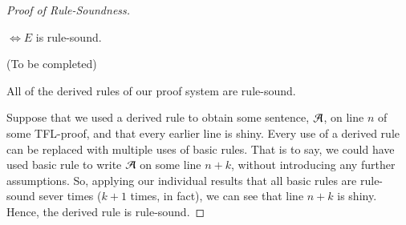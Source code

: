 \documentclass[12pt, a4paper, oneside, openright, titlepage]{book}
\begin{document}
\begin{proof}[Proof of Rule-Soundness]
    \begin{claim}[13]
        $\iff E$ is rule-sound.
    \end{claim}
    (To be completed)


    \begin{claim}[14]
        All of the derived rules of our proof system are rule-sound.
    \end{claim}
    Suppose that we used a derived rule to obtain some sentence, $\mathcal{A}$, on line $n$ of some TFL-proof, and that every earlier line is shiny. Every use of a derived rule can be replaced with multiple uses of basic rules. That is to say, we could have used basic rule to write $\mathcal{A}$ on some line $n+k$, without introducing any further assumptions. So, applying our individual results that all basic rules are rule-sound sever times ($k+1$ times, in fact), we can see that line $n+k$ is shiny. Hence, the derived rule is rule-sound.
\end{proof}







\begin{appendices}

\end{appendices}
\end{document}
